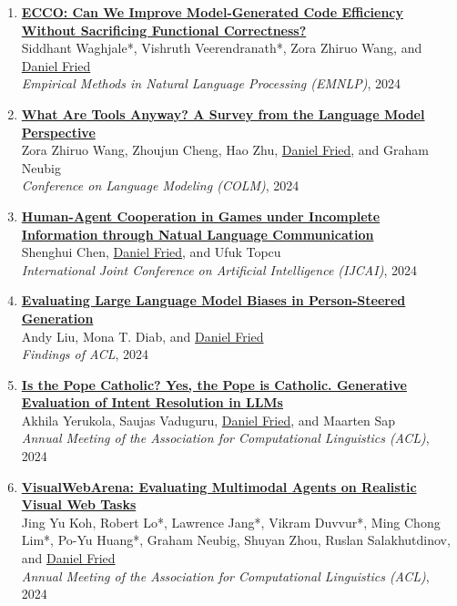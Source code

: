 \begin{enumerate}[leftmargin=-1mm,partopsep=0pt]
\item \href{http://arxiv.org/abs/2407.14044}{\textbf{ECCO: Can We Improve Model-Generated Code Efficiency Without Sacrificing Functional Correctness?}} \\
  Siddhant Waghjale*, Vishruth Veerendranath*, Zora Zhiruo Wang, and \underline{Daniel Fried}\\
  \emph{Empirical Methods in Natural Language Processing (EMNLP)}, 2024

\item \href{http://arxiv.org/abs/2403.15452}{\textbf{What Are Tools Anyway? A Survey from the Language Model Perspective}} \\
  Zora Zhiruo Wang, Zhoujun Cheng, Hao Zhu, \underline{Daniel Fried}, and Graham Neubig\\
  \emph{Conference on Language Modeling (COLM)}, 2024

\item \href{https://arxiv.org/abs/2405.14173}{\textbf{Human-Agent Cooperation in Games under Incomplete Information through Natual Language Communication }} \\
  Shenghui Chen, \underline{Daniel Fried}, and Ufuk Topcu\\
  \emph{International Joint Conference on Artificial Intelligence (IJCAI)}, 2024

\item \href{https://arxiv.org/abs/2405.20253}{\textbf{Evaluating Large Language Model Biases in Person-Steered Generation}} \\
  Andy Liu, Mona T. Diab, and \underline{Daniel Fried}\\
  \emph{Findings of ACL}, 2024

\item \href{https://arxiv.org/abs/2405.08760}{\textbf{Is the Pope Catholic? Yes, the Pope is Catholic. Generative Evaluation of Intent Resolution in LLMs}} \\
  Akhila Yerukola, Saujas Vaduguru, \underline{Daniel Fried}, and Maarten Sap\\
  \emph{Annual Meeting of the Association for Computational Linguistics (ACL)}, 2024

\item \href{https://arxiv.org/abs/2401.13649}{\textbf{VisualWebArena: Evaluating Multimodal Agents on Realistic Visual Web Tasks}} \\
  Jing Yu Koh, Robert Lo*, Lawrence Jang*, Vikram Duvvur*, Ming Chong Lim*, Po-Yu Huang*, Graham Neubig, Shuyan Zhou, Ruslan Salakhutdinov, and \underline{Daniel Fried}\\
  \emph{Annual Meeting of the Association for Computational Linguistics (ACL)}, 2024


\end{enumerate}

